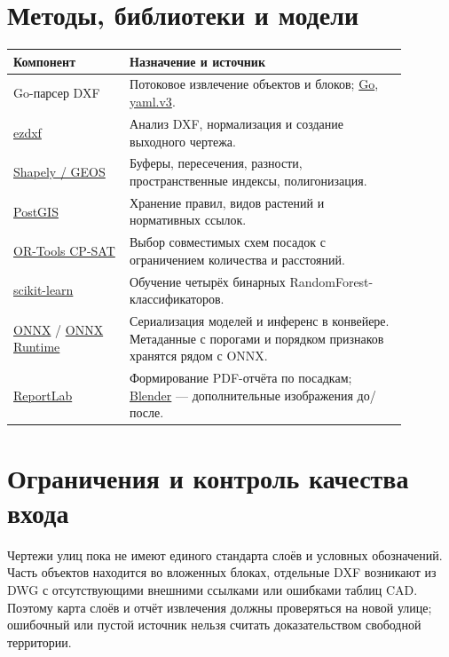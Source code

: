 \documentclass[11pt,a4paper]{article}
\begin{document}
\section{Методы, библиотеки и модели}
\begin{longtable}{p{0.26\linewidth}>{\raggedright\arraybackslash}p{0.62\linewidth}}
\toprule
Компонент & Назначение и источник\\\midrule\endhead
Go-парсер DXF & Потоковое извлечение объектов и блоков; \href{https://go.dev/}{Go}, \href{https://pkg.go.dev/gopkg.in/yaml.v3}{yaml.v3}.\\
\href{https://ezdxf.readthedocs.io/}{ezdxf} & Анализ DXF, нормализация и создание выходного чертежа.\\
\href{https://shapely.readthedocs.io/}{Shapely / GEOS} & Буферы, пересечения, разности, пространственные индексы, полигонизация.\\
\href{https://postgis.net/documentation/}{PostGIS} & Хранение правил, видов растений и нормативных ссылок.\\
\href{https://developers.google.com/optimization/cp/cp_solver}{OR-Tools CP-SAT} & Выбор совместимых схем посадок с ограничением количества и расстояний.\\
\href{https://scikit-learn.org/stable/}{scikit-learn} & Обучение четырёх бинарных RandomForest-классификаторов.\\
\href{https://onnx.ai/}{ONNX} / \href{https://onnxruntime.ai/docs/}{ONNX Runtime} & Сериализация моделей и инференс в конвейере. Метаданные с порогами и порядком признаков хранятся рядом с ONNX.\\
\href{https://www.reportlab.com/docs/reportlab-userguide.pdf}{ReportLab} & Формирование PDF-отчёта по посадкам; \href{https://www.blender.org/}{Blender} --- дополнительные изображения до/после.\\
\bottomrule
\end{longtable}

\section{Ограничения и контроль качества входа}
Чертежи улиц пока не имеют единого стандарта слоёв и условных обозначений. Часть объектов находится во вложенных блоках, отдельные DXF возникают из DWG с отсутствующими внешними ссылками или ошибками таблиц CAD. Поэтому карта слоёв и отчёт извлечения должны проверяться на новой улице; ошибочный или пустой источник нельзя считать доказательством свободной территории.
\end{document}
